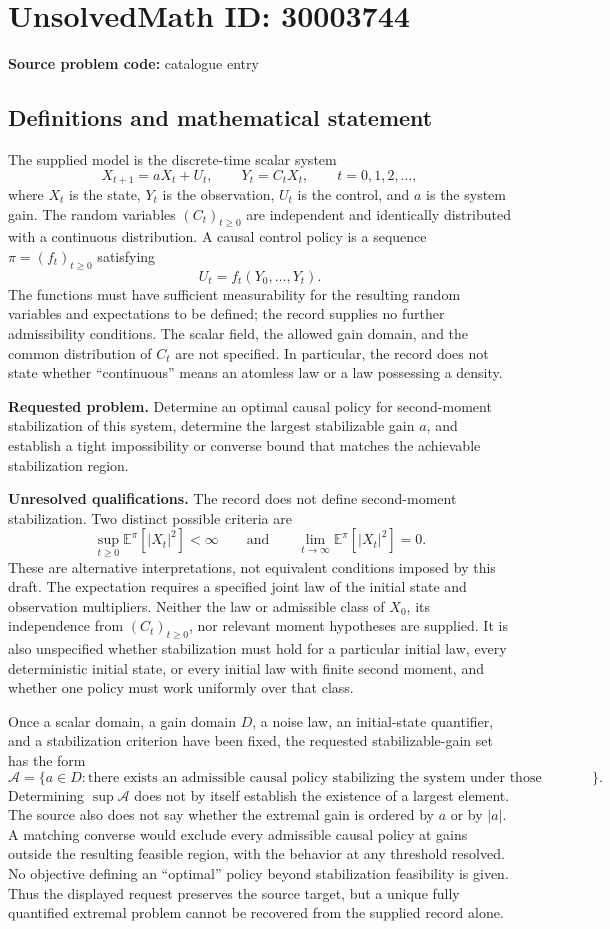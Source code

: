 \documentclass[11pt]{article}
\begin{document}
\section*{UnsolvedMath ID: 30003744}
\textbf{Source problem code:} catalogue entry
\subsection{Definitions and mathematical statement}
The supplied model is the discrete-time scalar system
\[
X_{t+1}=aX_t+U_t,\qquad Y_t=C_tX_t,\qquad t=0,1,2,\ldots,
\]
where \(X_t\) is the state, \(Y_t\) is the observation, \(U_t\) is the control, and \(a\) is the system gain. The random variables \((C_t)_{t\geq0}\) are independent and identically distributed with a continuous distribution. A causal control policy is a sequence \(\pi=(f_t)_{t\geq0}\) satisfying
\[
U_t=f_t(Y_0,\ldots,Y_t).
\]
The functions must have sufficient measurability for the resulting random variables and expectations to be defined; the record supplies no further admissibility conditions. The scalar field, the allowed gain domain, and the common distribution of \(C_t\) are not specified. In particular, the record does not state whether ``continuous'' means an atomless law or a law possessing a density.

\textbf{Requested problem.} Determine an optimal causal policy for second-moment stabilization of this system, determine the largest stabilizable gain \(a\), and establish a tight impossibility or converse bound that matches the achievable stabilization region.

\textbf{Unresolved qualifications.} The record does not define second-moment stabilization. Two distinct possible criteria are
\[
\sup_{t\geq0}\mathbb E^{\pi}[|X_t|^2]<\infty
\qquad\text{and}\qquad
\lim_{t\to\infty}\mathbb E^{\pi}[|X_t|^2]=0.
\]
These are alternative interpretations, not equivalent conditions imposed by this draft. The expectation requires a specified joint law of the initial state and observation multipliers. Neither the law or admissible class of \(X_0\), its independence from \((C_t)_{t\geq0}\), nor relevant moment hypotheses are supplied. It is also unspecified whether stabilization must hold for a particular initial law, every deterministic initial state, or every initial law with finite second moment, and whether one policy must work uniformly over that class.

Once a scalar domain, a gain domain \(D\), a noise law, an initial-state quantifier, and a stabilization criterion have been fixed, the requested stabilizable-gain set has the form
\[
\mathcal A=\{a\in D:\text{there exists an admissible causal policy stabilizing the system under those specifications}\}.
\]
Determining \(\sup\mathcal A\) does not by itself establish the existence of a largest element. The source also does not say whether the extremal gain is ordered by \(a\) or by \(|a|\). A matching converse would exclude every admissible causal policy at gains outside the resulting feasible region, with the behavior at any threshold resolved. No objective defining an ``optimal'' policy beyond stabilization feasibility is given. Thus the displayed request preserves the source target, but a unique fully quantified extremal problem cannot be recovered from the supplied record alone.
\end{document}
